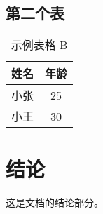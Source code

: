 \documentclass{article}
\begin{document}
\subsection{第二个表}
\begin{table}[htb]
    \centering
    \begin{tabular}{|c|c|}
    \hline
    姓名 & 年龄 \\
    \hline
    小张 & 25 \\
    小王 & 30 \\
    \hline
    \end{tabular}
    \caption{示例表格 B}
\end{table}

\section{结论}
这是文档的结论部分。
\end{document}
